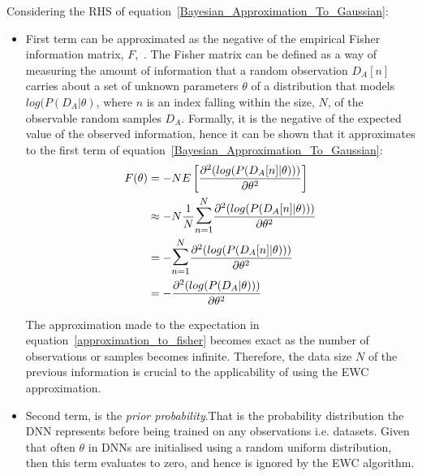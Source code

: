 \noindent Considering the RHS of equation~\ref{Bayesian_Approximation_To_Gaussian}:
\begin{itemize}
    \item First term can be approximated as the negative of the empirical Fisher information matrix, $F$,~\cite{Kay1993,Ly2017,Martens2020}. 
    The Fisher matrix can be defined as a way of measuring the amount of information that a random observation
    $D_A[n]$ carries about a set of unknown parameters $\theta$ of a distribution that models $log(P(D_A|\theta)$, where $n$ is an index falling within the size, $N$, of the observable random samples $D_A$. 
    Formally, it is the negative of the expected value of the observed information, hence it can be shown that it approximates to the first term of equation~\ref{Bayesian_Approximation_To_Gaussian}: 
%
    \begin{equation} \label{approximation_to_fisher}
    \begin{split}
    F(\theta) &= -N E\left[\frac{\partial^2(log(P(D_A[n]|\theta)))}{\partial\theta^2}\right]
    \\
    & \approx -N \frac{1}{N}\mathlarger{\mathlarger{\sum}}_{n=1}^{N} \frac{\partial^2(log(P(D_A[n]|\theta)))}{\partial\theta^2}
    \\
    &
    = -\mathlarger{\mathlarger{\sum}}_{n=1}^{N} \frac{\partial^2(log(P(D_A[n]|\theta)))}{\partial\theta^2} 
    \\
    &
    = -\frac{\partial^2(log(P(D_A|\theta)))}{\partial\theta^2} 
    \end{split}
    \end{equation}
    
    \noindent The approximation made to the expectation in equation~\ref{approximation_to_fisher} becomes exact as the number of observations or samples becomes infinite.
    Therefore, the data size $N$ of the previous information is crucial to the applicability of using the EWC approximation.
%
    \item Second term, is the \textit{prior probability}.That is the probability distribution the DNN represents before being trained on any observations i.e. datasets.
    Given that often $\theta$ in DNNs are initialised using a random uniform distribution, then this term evaluates to zero, and hence is ignored by the EWC algorithm.
    
    
    

\end{itemize}
